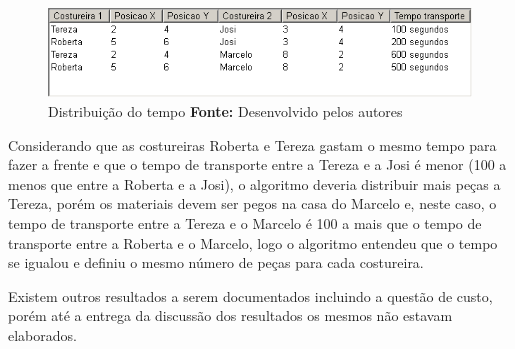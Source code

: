   \newpage
  
  \begin{figure}[h!]
  	\centerline{\includegraphics[scale=0.7]{./imagens/test_case_2_tempo_distribuicao.png}}
  	\caption[Distribuição do tempo]
  	{Distribuição do tempo  \textbf{Fonte:} Desenvolvido pelos autores}
  	\label{fig:exemplo1}
  \end{figure}
 
\par Considerando que as costureiras Roberta e Tereza gastam o mesmo tempo para fazer a frente e que o tempo de transporte 
entre a Tereza e a Josi é menor (100 a menos que entre a Roberta e a Josi), o algoritmo deveria distribuir mais peças a Tereza,
porém os materiais devem ser pegos na casa do Marcelo e, neste caso, o tempo de transporte entre a Tereza e o Marcelo é 100 
a mais que o tempo de transporte entre a Roberta e o Marcelo, logo o algoritmo entendeu que o tempo se igualou e definiu
o mesmo número de peças para cada costureira.

\par Existem outros resultados a serem documentados incluindo a questão de custo, porém até a entrega da discussão dos resultados
os mesmos não estavam elaborados.

